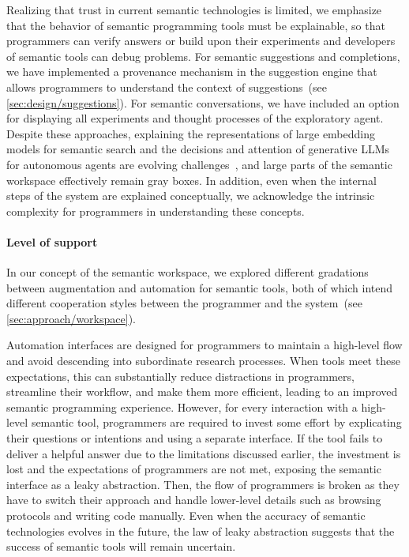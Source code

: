 Realizing that trust in current semantic technologies is limited, we emphasize that the behavior of semantic programming tools must be explainable, so that programmers can verify answers or build upon their experiments and developers of semantic tools can debug problems.
For semantic suggestions and completions, we have implemented a provenance mechanism in the suggestion engine that allows programmers to understand the context of suggestions~(see \cref{sec:design/suggestions}).
For semantic conversations, we have included an option for displaying all experiments and thought processes of the exploratory agent.
Despite these approaches, explaining the representations of large embedding models for semantic search and the decisions and attention of generative LLMs for autonomous agents are evolving challenges~\cites{chefer2021generic}[sec.~8.1.3]{zhao2023survey}, and large parts of the semantic workspace effectively remain gray boxes.
In addition, even when the internal steps of the system are explained conceptually, we acknowledge the intrinsic complexity for programmers in understanding these concepts.

\paragraph{Level of support}
\label{par:discussion/experience/process/support}

In our concept of the semantic workspace, we explored different gradations between augmentation and automation for semantic tools, both of which intend different cooperation styles between the programmer and the system~(see \cref{sec:approach/workspace}). %

Automation interfaces are designed for programmers to maintain a high-level flow and avoid descending into subordinate research processes.
When tools meet these expectations, this can substantially reduce distractions in programmers, streamline their workflow, and make them more efficient, leading to an improved semantic programming experience.
However, for every interaction with a high-level semantic tool, programmers are required to invest some effort by explicating their questions or intentions and using a separate interface.
If the tool fails to deliver a helpful answer due to the limitations discussed earlier, the investment is lost and the expectations of programmers are not met, exposing the semantic interface as a leaky abstraction.
Then, the flow of programmers is broken as they have to switch their approach and handle lower-level details such as browsing protocols and writing code manually.
Even when the accuracy of semantic technologies evolves in the future, the law of leaky abstraction suggests that the success of semantic tools will remain uncertain.

